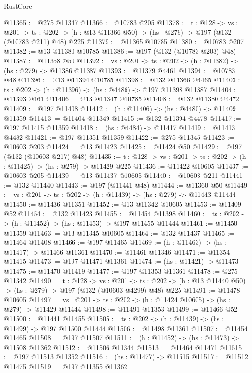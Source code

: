 \begin{lexlean}{RustCore}
\begin{coremodule}
@11365 := @275 @11347
@11366 := @10783 @205
@11378 := {t : @128} ->
  {vs : @201} ->
  {ts : @202} -> (h : @13 @11366 @50) -> (hs : @279) -> @197 (@132 (@10783 @211) @48) @225
@11379 := @11365 @10785
@11380 := @10783 @207
@11382 := @13 @11380 @10785
@11386 := @197 (@132 (@10783 @203) @48)
@11387 := @11358 @50
@11392 := {vs : @201} -> {ts : @202} -> (h : @11382) -> (hs : @279) -> @11386 @11387
@11393 := @11379 @4461
@11394 := @10783 @48
@11396 := @13 @11394 @10785
@11398 := @132 @11366 @4465
@11403 := {ts : @202} -> (h : @11396) -> (hs : @4486) -> @197 @11398 @11387
@11404 := @11393 @161
@11406 := @13 @11347 @10785
@11408 := @132 @11380 @4472
@11409 := @197 @11408
@11412 := (h : @11406) -> (hs : @4480) -> @11409 @11359
@11413 := @11404 @11349
@11415 := @132 @11394 @4478
@11417 := @197 @11415 @11359
@11418 := (hs : @4484) -> @11417
@11419 := @11413 @4482
@11421 := @197 @11351 @11359
@11422 := @275 @11345
@11423 := @10603 @203
@11424 := @13 @11423
@11425 := @11424 @50
@11429 := @197 (@132 (@10603 @217) @48)
@11435 := {t : @128} -> {vs : @201} -> {ts : @202} -> (h : @11425) -> (hs : @279) -> @11429 @225
@11436 := @11422 @10605
@11437 := @10603 @205
@11439 := @13 @11437 @10605
@11440 := @10603 @211
@11441 := @132 @11440
@11443 := @197 (@11441 @48)
@11444 := @11360 @50
@11449 := {vs : @201} -> {ts : @202} -> (h : @11439) -> (hs : @279) -> @11443 @11444
@11450 := @11436 @11351
@11452 := @13 @11342 @10605
@11453 := @11409 @52
@11454 := @132 @11423
@11455 := @11454 @11398
@11460 := {ts : @202} -> (h : @11452) -> (hs : @11453) -> @197 @11455 @11444
@11461 := @11450 @11359
@11463 := @13 @11345 @10605
@11464 := @132 @11437
@11465 := @11464 @11408
@11466 := @197 @11465
@11469 := (h : @11463) -> (hs : @11417) -> @11466 @11361
@11470 := @11461 @11346
@11471 := @11354 @11415
@11473 := @197 @11471 @11361
@11474 := (hs : @11421) -> @11473
@11475 := @11470 @11419
@11477 := @197 @11353 @11361
@11478 := @275 @11342
@11490 := {t : @128} ->
  {vs : @201} ->
  {ts : @202} -> (h : @13 @11440 @50) -> (hs : @279) -> @197 (@132 (@10603 @4299) @48) @225
@11491 := @11478 @10605
@11497 := {vs : @201} -> {ts : @202} -> (h : @11424 @10605) -> (hs : @279) -> @11429 @11444
@11498 := @11491 @11353
@11499 := @11466 @52
@11500 := @11441 @11455
@11505 := {ts : @202} -> (h : @11439) -> (hs : @11499) -> @197 @11500 @11444
@11506 := @11498 @11361
@11507 := @11454 @11465
@11508 := @197 @11507
@11511 := (h : @11452) -> (hs : @11473) -> @11508 @11362
@11512 := @11506 @11344
@11513 := @11464 @11471
@11515 := @197 @11513 @11362
@11516 := (hs : @11477) -> @11515
@11517 := @11512 @11475
@11519 := @197 @11355 @11362

\end{coremodule}
\end{lexlean}
